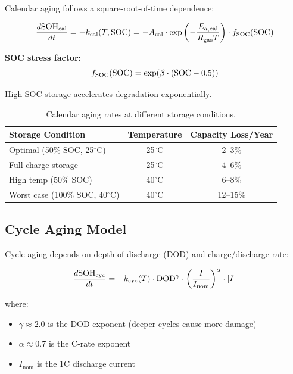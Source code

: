 Calendar aging follows a square-root-of-time dependence:

\begin{equation}
    \frac{d\text{SOH}_{\text{cal}}}{dt} = -k_{\text{cal}}(T, \text{SOC}) = -A_{\text{cal}} \cdot \exp\left(-\frac{E_{a,\text{cal}}}{R_{\text{gas}} T}\right) \cdot f_{\text{SOC}}(\text{SOC})
    \label{eq:calendar_aging}
\end{equation}

\textbf{SOC stress factor:}
\begin{equation}
    f_{\text{SOC}}(\text{SOC}) = \exp(\beta \cdot (\text{SOC} - 0.5))
\end{equation}

High SOC storage accelerates degradation exponentially.

\begin{table}[H]
    \centering
    \caption{Calendar aging rates at different storage conditions.}
    \label{tab:calendar_aging}
    \begin{tabular}{lcc}
        \toprule
        \textbf{Storage Condition} & \textbf{Temperature} & \textbf{Capacity Loss/Year} \\
        \midrule
        Optimal (50\% SOC, 25$^\circ$C) & 25$^\circ$C & 2--3\% \\
        Full charge storage & 25$^\circ$C & 4--6\% \\
        High temp (50\% SOC) & 40$^\circ$C & 6--8\% \\
        Worst case (100\% SOC, 40$^\circ$C) & 40$^\circ$C & 12--15\% \\
        \bottomrule
    \end{tabular}
\end{table}

\subsection{Cycle Aging Model}
\label{subsec:cycle_aging}

Cycle aging depends on depth of discharge (DOD) and charge/discharge rate:

\begin{equation}
    \frac{d\text{SOH}_{\text{cyc}}}{dt} = -k_{\text{cyc}}(T) \cdot \text{DOD}^{\gamma} \cdot \left(\frac{I}{I_{\text{nom}}}\right)^{\alpha} \cdot |I|
    \label{eq:cycle_aging}
\end{equation}

where:
\begin{itemize}
    \item $\gamma \approx 2.0$ is the DOD exponent (deeper cycles cause more damage)
    \item $\alpha \approx 0.7$ is the C-rate exponent
    \item $I_{\text{nom}}$ is the 1C discharge current
\end{itemize}

